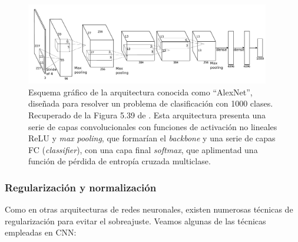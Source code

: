 \begin{figure}[htbp]
    \centering
    \includegraphics[width=0.95\textwidth]{capitulos/cap_02/imagenes/CNN_complete.png}
    \caption[
        Esquema gráfico de la arquitectura conocida como ``AlexNet'', diseñada para resolver un problema
        de clasificación con 1000 clases.
        Recuperado de la Figura 5.39 de \cite{szeliski2010}.
    ]{
        Esquema gráfico de la arquitectura conocida como ``AlexNet'', diseñada para resolver un problema
        de clasificación con 1000 clases.
        Recuperado de la Figura 5.39 de \cite{szeliski2010}.
        Esta arquitectura presenta una serie de capas convolucionales con funciones de activación no lineales ReLU y \textit{max pooling}, que formarían el \textit{backbone} y una serie de capas \acrshort{FC} (\textit{classifier}), con una capa final \textit{softmax}, que aplimentad una función de pérdida de entropía cruzada multiclase.
    } 
    \label{fig:CNN_complete}
\end{figure}


\subsubsection{Regularización y normalización}

Como en otras arquitecturas de redes neuronales, existen numerosas técnicas de regularización para evitar el sobreajuste. Veamos algunas de las técnicas empleadas en \acrshort{CNN}:

